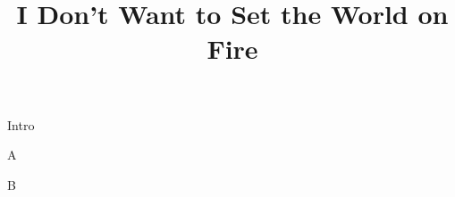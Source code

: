 \documentclass[timestamp]{jazzgrid}
\title{I Don't Want to Set the World on Fire}
\begin{document}
\maketitle
\begin{musicsection}{Intro}
	{\barfour{}
		{}
		{}
		{}
		{}
	}
	{\barfour{}
		{}
		{}
		{}
		{}
	}
\end{musicsection}

\begin{musicsection}{A}
\barline
	{\barfour{}
		{}
		{}
		{}
		{}
	}
	{\barfour{}
		{}
		{}
		{}
		{}
	}
	{\barfour{}
		{}
		{}
		{}
		{}
	}
	{\barfour{}
		{}
		{}
		{}
		{}
	}
\barline
	{\barfour{}
		{}
		{}
		{}
		{}
	}
	{\barfour{}
		{}
		{}
		{}
		{}
	}
	{
		{}
		{}
		{}
		{}
	}
	{\barfour{}
		{}
		{}
		{}
		{}
	}
	{
		{}
		{}
		{}
		{}
	}
	{\barfour{}
		{}
		{}
		{}
		{}
	}
	{
		{}
		{}
		{}
		{}
	}
	{\barfour{}
		{}
		{}
		{}
		{}
	}
\end{musicsection}


\begin{musicsection}{B}
\barline
	{\barfour{}
		{}
		{}
		{}
		{}
	}
	{\barfour{}
		{}
		{}
		{}
		{}
	}
	{\barfour{}
		{}
		{}
		{}
		{}
	}
	{\barfour{}
		{}
		{}
		{}
		{}
	}
\barline
	{\barfour{}
		{}
		{}
		{}
		{}
	}
	{\barfour{}
		{}
		{}
		{}
		{}
	}
	{\barfour{}
		{}
		{}
		{}
		{}
	}
	{\barfour{}
		{}
		{}
		{}
		{}
	}
\end{musicsection}
\end{document}
